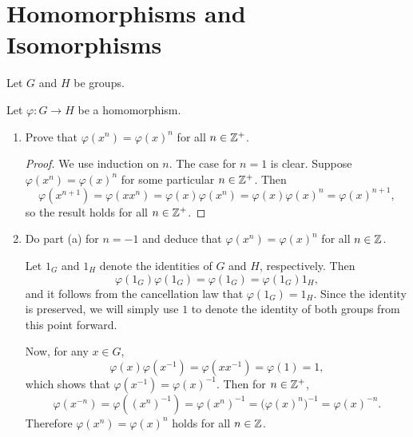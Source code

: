 \section{Homomorphisms and Isomorphisms}

Let $G$ and $H$ be groups.

 Let $\varphi\colon G\to H$ be a homomorphism.
\label{exercise-homomorphism-preserves-powers}
\begin{enumerate}
\item Prove that $\varphi(x^n) = \varphi(x)^n$ for all $n\in\mathbb{Z}^+$.
  \begin{proof}
    We use induction on $n$. The case for $n = 1$ is clear. Suppose
    $\varphi(x^n) = \varphi(x)^n$ for some particular $n\in\mathbb{Z}^+$. Then
    \begin{equation*}
      \varphi(x^{n+1})
      = \varphi(xx^n)
      = \varphi(x)\varphi(x^n)
      = \varphi(x)\varphi(x)^n
      = \varphi(x)^{n+1},
    \end{equation*}
    so the result holds for all $n\in\mathbb{Z}^+$.
  \end{proof}
\item Do part (a) for $n = -1$ and deduce that
  $\varphi(x^n) = \varphi(x)^n$ for all $n\in\mathbb{Z}$.
  \begin{solution}
    Let $1_G$ and $1_H$ denote the identities of $G$ and $H$,
    respectively. Then
    \begin{equation*}
      \varphi(1_G)\varphi(1_G) = \varphi(1_G) = \varphi(1_G)1_H,
    \end{equation*}
    and it follows from the cancellation law that
    $\varphi(1_G) = 1_H$. Since the identity is preserved, we will
    simply use $1$ to denote the identity of both groups from this
    point forward.

    Now, for any $x\in G$,
    \begin{equation*}
      \varphi(x)\varphi(x^{-1}) = \varphi(xx^{-1}) = \varphi(1) = 1,
    \end{equation*}
    which shows that $\varphi(x^{-1}) = \varphi(x)^{-1}$. Then for
    $n\in\mathbb{Z}^+$,
    \begin{equation*}
      \varphi(x^{-n}) = \varphi((x^n)^{-1}) = \varphi(x^n)^{-1}
      = \big(\varphi(x)^n\big)^{-1} = \varphi(x)^{-n}.
    \end{equation*}
    Therefore $\varphi(x^n) = \varphi(x)^n$ holds for all $n\in\mathbb{Z}$.
  \end{solution}
\end{enumerate}

